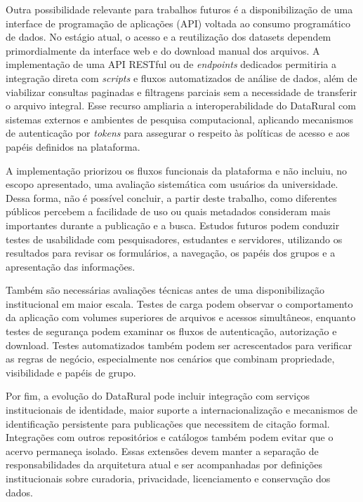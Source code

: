 Outra possibilidade relevante para trabalhos futuros é a disponibilização de uma interface de programação de aplicações (API) voltada ao consumo programático de dados. No estágio atual, o acesso e a reutilização dos datasets dependem primordialmente da interface web e do download manual dos arquivos. A implementação de uma API RESTful ou de \textit{endpoints} dedicados permitiria a integração direta com \textit{scripts} e fluxos automatizados de análise de dados, além de viabilizar consultas paginadas e filtragens parciais sem a necessidade de transferir o arquivo integral. Esse recurso ampliaria a interoperabilidade do DataRural com sistemas externos e ambientes de pesquisa computacional, aplicando mecanismos de autenticação por \textit{tokens} para assegurar o respeito às políticas de acesso e aos papéis definidos na plataforma.

A implementação priorizou os fluxos funcionais da plataforma e não incluiu, no escopo apresentado, uma avaliação sistemática com usuários da universidade. Dessa forma, não é possível concluir, a partir deste trabalho, como diferentes públicos percebem a facilidade de uso ou quais metadados consideram mais importantes durante a publicação e a busca. Estudos futuros podem conduzir testes de usabilidade com pesquisadores, estudantes e servidores, utilizando os resultados para revisar os formulários, a navegação, os papéis dos grupos e a apresentação das informações.

Também são necessárias avaliações técnicas antes de uma disponibilização institucional em maior escala. Testes de carga podem observar o comportamento da aplicação com volumes superiores de arquivos e acessos simultâneos, enquanto testes de segurança podem examinar os fluxos de autenticação, autorização e download. Testes automatizados também podem ser acrescentados para verificar as regras de negócio, especialmente nos cenários que combinam propriedade, visibilidade e papéis de grupo.

Por fim, a evolução do DataRural pode incluir integração com serviços institucionais de identidade, maior suporte a internacionalização e mecanismos de identificação persistente para publicações que necessitem de citação formal. Integrações com outros repositórios e catálogos também podem evitar que o acervo permaneça isolado. Essas extensões devem manter a separação de responsabilidades da arquitetura atual e ser acompanhadas por definições institucionais sobre curadoria, privacidade, licenciamento e conservação dos dados.

